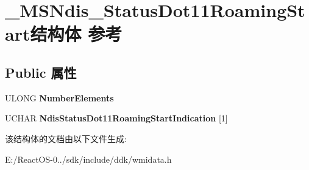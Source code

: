 \hypertarget{struct___m_s_ndis___status_dot11_roaming_start}{}\section{\+\_\+\+M\+S\+Ndis\+\_\+\+Status\+Dot11\+Roaming\+Start结构体 参考}
\label{struct___m_s_ndis___status_dot11_roaming_start}
\subsection*{Public 属性}
\begin{DoxyCompactItemize}
\item 
\mbox{\label{struct___m_s_ndis___status_dot11_roaming_start_a8905ee97968fd25221fddcc14f7f752d}} 
U\+L\+O\+NG {\bfseries Number\+Elements}
\item 
\mbox{\label{struct___m_s_ndis___status_dot11_roaming_start_abeaafe34383b1be489c2074f04c89a46}} 
U\+C\+H\+AR {\bfseries Ndis\+Status\+Dot11\+Roaming\+Start\+Indication} \mbox{[}1\mbox{]}
\end{DoxyCompactItemize}


该结构体的文档由以下文件生成\+:\begin{DoxyCompactItemize}
\item 
E\+:/\+React\+O\+S-\/0../sdk/include/ddk/wmidata.\+h\end{DoxyCompactItemize}
